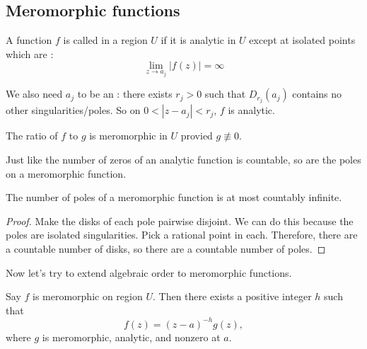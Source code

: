 \documentclass[notes]{subfile}
\begin{document}
\subsection{Meromorphic functions}

\begin{definition}
    A function $f$ is called  in a region
    $U$ if it is analytic in $U$ except at isolated points
    which are :
    \[ \lim_{z \to a_j} |f(z)| = \infty 
        \tag{for $a_j$ running over a countable index set $I$}
    \]

    We also need $a_j$ to be an :
    there exists $r_j>0$ such that $D_{r_j}(a_j)$
    contains no other singularities/poles.
    So on $0 < |z-a_j| < r_j$, $f$ is analytic.

\end{definition}

\begin{exercise}
    The ratio of $f$ to $g$ is meromorphic in $U$ provied
    $g \nequiv 0$.
\end{exercise}

Just like the number of zeros of an analytic function is countable,
so are the poles on a meromorphic function.

\begin{theorem}
    The number of poles of a meromorphic function
    is at most countably infinite.
\end{theorem}

\begin{proof}
    Make the disks of each pole pairwise disjoint.
    We can do this because the poles are isolated singularities.
    Pick a rational point in each.
    Therefore, there are a countable number of disks,
    so there are a countable number of poles.
\end{proof}

Now let's try to extend algebraic order to meromorphic 
functions.

\begin{theorem}
    Say $f$ is meromorphic on region $U$.
    Then there exists a positive integer $h$ such that
    \[ f(z) = (z-a)^{-h} g(z), \]
    where $g$ is meromorphic, analytic, and nonzero at $a$.
\end{theorem}
\end{document}
